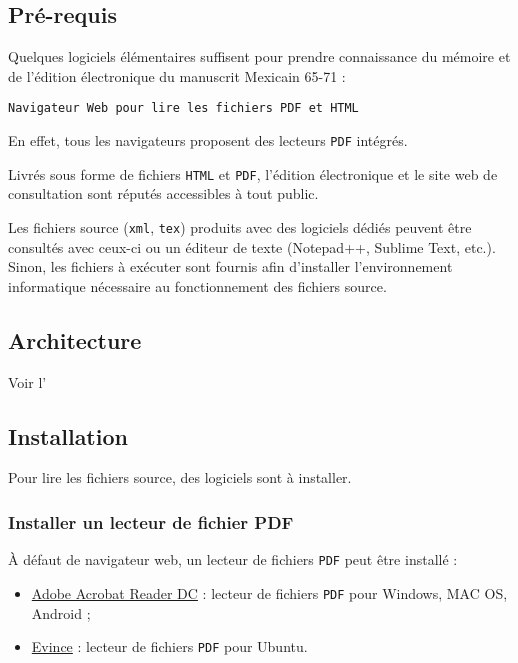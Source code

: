 \documentclass[a4paper,twoside,12pt]{article}
\begin{document}
\subsection{Pr\'e-requis}

Quelques logiciels \'el\'ementaires suffisent pour prendre connaissance du m\'emoire et de l'\'edition \'electronique du manuscrit Mexicain 65-71 :

\begin{lstlisting}
Navigateur Web pour lire les fichiers PDF et HTML
\end{lstlisting}

En effet, tous les navigateurs proposent des lecteurs \texttt{PDF} int\'egr\'es.

Livr\'es sous forme de fichiers \texttt{HTML} et \texttt{PDF}, l'\'edition \'electronique et le site web de consultation sont r\'eput\'es accessibles \`a tout public.

Les fichiers source (\texttt{xml}, \texttt{tex}) produits avec des logiciels d\'edi\'es peuvent être consult\'es avec ceux-ci ou un \'editeur de texte (Notepad++,
Sublime Text, etc.). Sinon, les fichiers \`a ex\'ecuter sont fournis afin d'installer l'environnement informatique n\'ecessaire au fonctionnement des fichiers source.

\subsection{Architecture}

Voir l'

\subsection{Installation}

Pour lire les fichiers source, des logiciels sont \`a installer.

\subsubsection{Installer un lecteur de fichier PDF}

\`A d\'efaut de navigateur web, un lecteur de fichiers \texttt{PDF} peut être install\'e :
\begin{itemize}
	\item \href{https://get.adobe.com/fr/reader/otherversions/}{Adobe Acrobat Reader DC} : lecteur de fichiers \texttt{PDF} pour Windows, MAC OS, Android ;
	\item \href{https://wiki.gnome.org/Apps/Evince/Downloads}{Evince} : lecteur de fichiers \texttt{PDF} pour Ubuntu.
\end{itemize}
\end{document}
